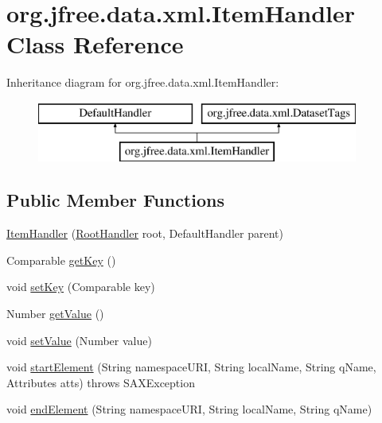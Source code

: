 \hypertarget{classorg_1_1jfree_1_1data_1_1xml_1_1_item_handler}{}\section{org.\+jfree.\+data.\+xml.\+Item\+Handler Class Reference}
\label{classorg_1_1jfree_1_1data_1_1xml_1_1_item_handler}
Inheritance diagram for org.\+jfree.\+data.\+xml.\+Item\+Handler\+:\begin{figure}[H]
\begin{center}
\leavevmode
\includegraphics[height=2.000000cm]{classorg_1_1jfree_1_1data_1_1xml_1_1_item_handler}
\end{center}
\end{figure}
\subsection*{Public Member Functions}
\begin{DoxyCompactItemize}
\item 
\mbox{\hyperlink{classorg_1_1jfree_1_1data_1_1xml_1_1_item_handler_a5721292470132649314a94019ff0de02}{Item\+Handler}} (\mbox{\hyperlink{classorg_1_1jfree_1_1data_1_1xml_1_1_root_handler}{Root\+Handler}} root, Default\+Handler parent)
\item 
Comparable \mbox{\hyperlink{classorg_1_1jfree_1_1data_1_1xml_1_1_item_handler_a603f79447ccd712dcffff1eef751a752}{get\+Key}} ()
\item 
void \mbox{\hyperlink{classorg_1_1jfree_1_1data_1_1xml_1_1_item_handler_ac7cd00aeccc0427628f684c029b1012d}{set\+Key}} (Comparable key)
\item 
Number \mbox{\hyperlink{classorg_1_1jfree_1_1data_1_1xml_1_1_item_handler_a86d2c7a9bf8bc41f02128daea93bd8d6}{get\+Value}} ()
\item 
void \mbox{\hyperlink{classorg_1_1jfree_1_1data_1_1xml_1_1_item_handler_a860aeb1aaaa02ffa563f633197df2595}{set\+Value}} (Number value)
\item 
void \mbox{\hyperlink{classorg_1_1jfree_1_1data_1_1xml_1_1_item_handler_a5e5c434af533d5d04f02f29700feb8e7}{start\+Element}} (String namespace\+U\+RI, String local\+Name, String q\+Name, Attributes atts)  throws S\+A\+X\+Exception 
\item 
void \mbox{\hyperlink{classorg_1_1jfree_1_1data_1_1xml_1_1_item_handler_a01ee05dd1aceaa48af6b402e7d45d45e}{end\+Element}} (String namespace\+U\+RI, String local\+Name, String q\+Name)
\end{DoxyCompactItemize}
